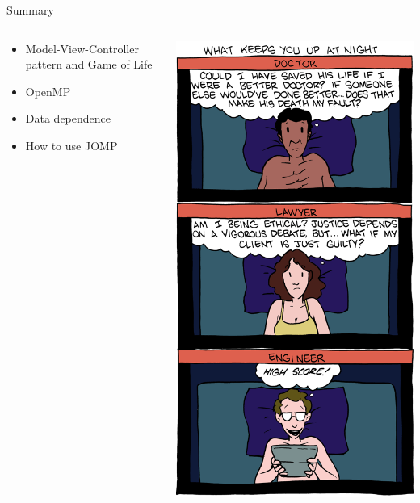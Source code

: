 \begin{frame}{Summary}
  \begin{columns}[c]
    \begin{column}{0.55\textwidth}
      \begin{itemize}
      \item Model-View-Controller pattern and Game of Life
      \item OpenMP
      \item Data dependence
      \item How to use JOMP
      \end{itemize}
    \end{column}
    \begin{column}{0.45\textwidth}
      \begin{center}
        \includegraphics[scale=0.2]{figures/smbc}\\

\end{center}
\end{column}
\end{columns}
\end{frame}
